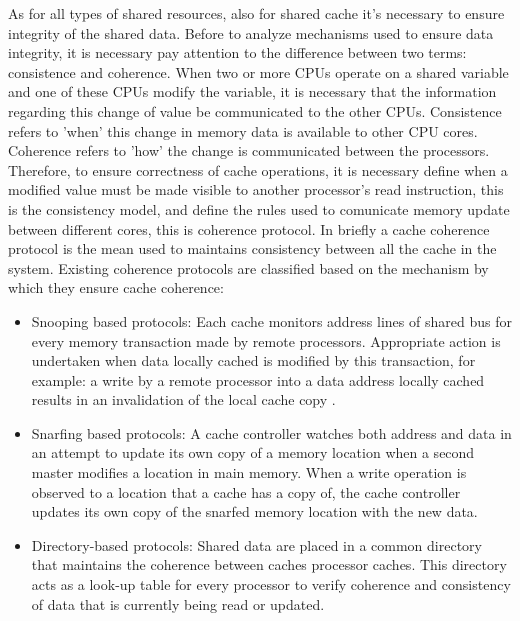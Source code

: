 As for all types of shared resources, also for shared cache it's necessary to ensure integrity of the shared data.
Before to analyze mechanisms used to ensure data integrity, it is necessary pay attention to the difference between two terms: consistence and coherence.
When two or more CPUs operate on a shared variable and one of these CPUs modify the variable, it is necessary that the information regarding
this change of value be communicated to the other CPUs. Consistence refers to 'when' this change in memory data is available to other CPU cores.
Coherence refers to 'how' the change is communicated between the processors. Therefore, to ensure correctness of cache operations, it is necessary define
when a modified value must be made visible to another processor's read instruction, this is the consistency model, and define the rules used to comunicate 
memory update between different cores, this is coherence protocol. In briefly a cache coherence protocol is the mean used to maintains consistency between
all the cache in the system.
Existing coherence protocols are classified based on the mechanism by which they ensure cache coherence: 

\begin{itemize}

\item Snooping based protocols: Each cache monitors address lines of shared bus for every memory transaction made by remote processors. Appropriate action
is undertaken when data locally cached is modified by this transaction, for example: a write by a remote processor into a data address locally cached 
results in an invalidation of the local cache copy .

\item Snarfing based protocols: A cache controller watches both address and data in an attempt to update its own copy of a memory location when a second 
master modifies a location in main memory. When a write operation is observed to a location that a cache has a copy of, the cache controller updates its 
own copy of the snarfed memory location with the new data.

\item Directory-based protocols: Shared data are placed in a common directory that maintains the coherence between caches processor caches. 
This directory acts as a look-up table for every processor to verify coherence and consistency of data that is currently being read or updated.

\end{itemize}


